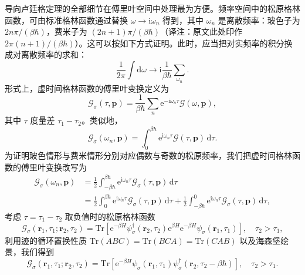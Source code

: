 导向卢廷格定理的全部细节在傅里叶空间中处理最为方便。频率空间中的松原格林函数，可由标准格林函数通过替换 $\omega \to \mathrm{i}\omega_{n}$ 得到，其中 $\omega_{n}$ 是离散频率：玻色子为 $2n\pi/(\beta\hbar)$，费米子为 $(2n+1)\pi/(\beta\hbar)$（译注：原文此处印作 $2\pi(n+1)/(\beta\hbar)$）。这可以按如下方式证明。此时，应当把对实频率的积分换成对离散频率的求和：
\begin{equation*}
\frac{1}{2\pi}\int\mathrm{d}\omega \to \mathrm{i}\frac{1}{\beta\hbar}\sum_{\omega_{n}}.
\tag{7.123}
\end{equation*}
形式上，虚时间格林函数的傅里叶变换定义为
\begin{equation*}
\mathcal{G}_{\sigma}(\tau,\mathbf{p}) = \frac{1}{\beta\hbar}\sum_{n}\mathrm{e}^{-\mathrm{i}\omega_{n}\tau}\mathcal{G}(\omega,\mathbf{p}),
\tag{7.124}
\end{equation*}
其中 $\tau$ 度量差 $\tau_{1} - \tau_{2}$。类似地，
\begin{equation*}
\mathcal{G}_{\sigma}(\omega_{n},\mathbf{p}) = \int_{0}^{\beta\hbar}\mathrm{e}^{\mathrm{i}\omega_{n}\tau}\mathcal{G}(\tau,\mathbf{p})\,\mathrm{d}\tau.
\tag{7.125}
\end{equation*}
为证明玻色情形与费米情形分别对应偶数与奇数的松原频率，我们把虚时间格林函数的傅里叶变换改写为
\begin{align*}
\mathcal{G}_{\sigma}(\omega_{n},\mathbf{p}) &= \frac{1}{2}\int_{-\beta\hbar}^{\beta\hbar}\mathrm{e}^{\mathrm{i}\omega_{n}\tau}\mathcal{G}_{\sigma}(\tau,\mathbf{p})\,\mathrm{d}\tau \\
&= \frac{1}{2}\int_{0}^{\beta\hbar}\mathrm{e}^{\mathrm{i}\omega_{n}\tau}\mathcal{G}_{\sigma}(\tau,\mathbf{p})\,\mathrm{d}\tau + \frac{1}{2}\int_{-\beta\hbar}^{0}\mathrm{e}^{\mathrm{i}\omega_{n}\tau}\mathcal{G}_{\sigma}(\tau,\mathbf{p})\,\mathrm{d}\tau,
\tag{7.126}
\end{align*}
考虑 $\tau = \tau_{1} - \tau_{2}$ 取负值时的松原格林函数
\begin{equation*}
\mathcal{G}_{\sigma}(\mathbf{r}_{1},\tau_{1};\mathbf{r}_{2},\tau_{2}) = \mathrm{Tr}\left[\mathrm{e}^{-\beta H}\psi^{\dagger}_{\sigma}(\mathbf{r}_{2},\tau_{2})\mathrm{e}^{\beta H}\mathrm{e}^{-\beta H}\psi_{\sigma}(\mathbf{r}_{1},\tau_{1})\right], \quad \tau_{2} > \tau_{1},
\tag{7.127}
\end{equation*}
利用迹的循环置换性质 $\mathrm{Tr}(ABC) = \mathrm{Tr}(BCA) = \mathrm{Tr}(CAB)$ 以及海森堡绘景，我们得到
\begin{equation*}
\mathcal{G}_{\sigma}(\mathbf{r}_{1},\tau_{1};\mathbf{r}_{2},\tau_{2}) = \mathrm{Tr}\left[\mathrm{e}^{-\beta H}\psi_{\sigma}(\mathbf{r}_{1},\tau_{1})\psi^{\dagger}_{\sigma}(\mathbf{r}_{2},\tau_{2} - \beta\hbar)\right], \quad \tau_{2} > \tau_{1}.
\tag{7.128}
\end{equation*}
